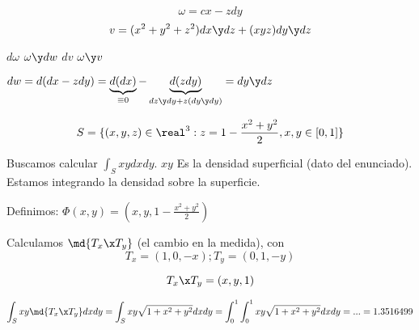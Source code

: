 \begin{problem}[2]

\[\omega = cx - zdy\]
\[v= (x^2+y^2+z^2)dx\y dz + (xyz)dy\y dz\]

\ppart $d\omega$
\ppart $\omega \y dw$
\ppart $dv$
\ppart $\omega \y v$

\solution

\spart $dw = d(dx-zdy) = \underbrace{d(dx)}_{\equiv 0} - \underbrace{d(zdy)}_{dz\y dy + z(dy\y dy)} = dy\y dz$

\spart

\spart

\spart


\end{problem}

\begin{problem}[13]
\[S=\{(x,y,z)\in\real^3: z=1-\frac{x^2+y^2}{2},x,y\in[0,1]\}\]

\solution

Buscamos calcular $\int_S xydxdy$. $xy$ Es la densidad superficial (dato del enunciado). Estamos integrando la densidad sobre la superficie.

Definimos: $\Phi(x,y) = \left(x,y,1-\frac{x^2+y^2}{2}\right)$

Calculamos $\md{T_x\x T_y}$ (el cambio en la medida), con
\[T_x = (1,0,-x);T_y=(0,1,-y)\]

\[T_x\x T_y = (x,y,1)\]

\[\int_S xy \md{T_x\x T_y} dxdy = \int_S xy\sqrt{1+x^2+y^2}dxdy = \int_0^1\int_0^1 xy\sqrt{1+x^2+y^2} dxdy = ... = 1.3516499\]

\end{problem}

